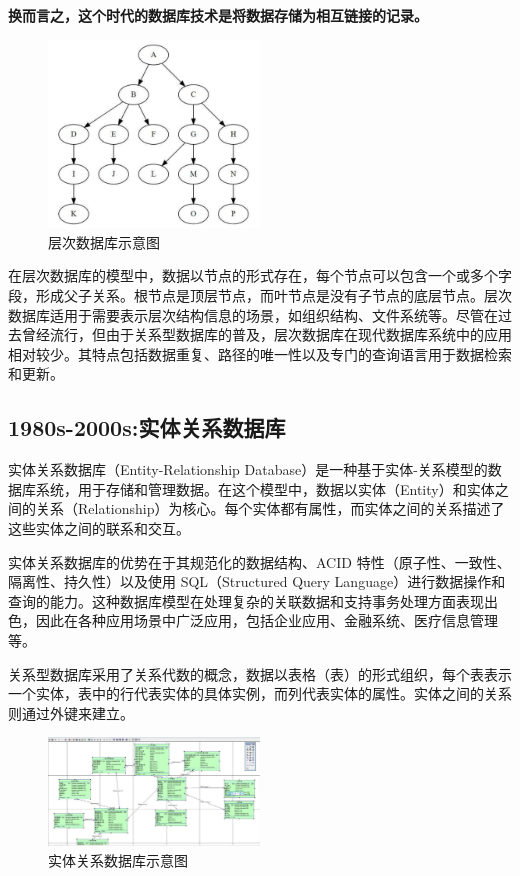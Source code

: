 \documentclass[11pt, a4paper, oneside, UTF8]{ctexbook}
\begin{document}
\textbf{换而言之，这个时代的数据库技术是将数据存储为相互链接的记录。}
\begin{figure}[htbp]
  \center
  \includegraphics[width=0.5\textwidth]{picture/层次数据库示意图.png}
  \caption{层次数据库示意图}
  \label{fig:hierarchicalDatabase}
\end{figure}
在层次数据库的模型中，数据以节点的形式存在，每个节点可以包含一个或多个字段，形成父子关系。根节点是顶层节点，而叶节点是没有子节点的底层节点。层次数据库适用于需要表示层次结构信息的场景，如组织结构、文件系统等。尽管在过去曾经流行，但由于关系型数据库的普及，层次数据库在现代数据库系统中的应用相对较少。其特点包括数据重复、路径的唯一性以及专门的查询语言用于数据检索和更新。
\subsection{1980s-2000s:实体关系数据库}
实体关系数据库（Entity-Relationship Database）是一种基于实体-关系模型的数据库系统，用于存储和管理数据。在这个模型中，数据以实体（Entity）和实体之间的关系（Relationship）为核心。每个实体都有属性，而实体之间的关系描述了这些实体之间的联系和交互。

实体关系数据库的优势在于其规范化的数据结构、ACID 特性（原子性、一致性、隔离性、持久性）以及使用 SQL（Structured Query Language）进行数据操作和查询的能力。这种数据库模型在处理复杂的关联数据和支持事务处理方面表现出色，因此在各种应用场景中广泛应用，包括企业应用、金融系统、医疗信息管理等。

关系型数据库采用了关系代数的概念，数据以表格（表）的形式组织，每个表表示一个实体，表中的行代表实体的具体实例，而列代表实体的属性。实体之间的关系则通过外键来建立。
\begin{figure}[htbp]
  \center
  \includegraphics[width=0.5\textwidth]{picture/实体关系数据库示意图.png}
  \caption{实体关系数据库示意图}
  \label{fig:relationDatabase}
\end{figure}
\end{document}
